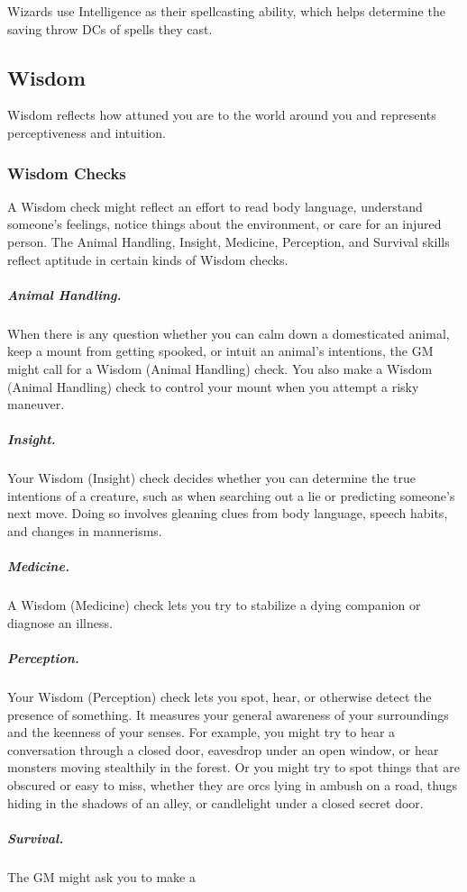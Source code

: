 Wizards use Intelligence as their spellcasting ability, which helps determine the saving throw DCs of spells they cast.

\subsection{Wisdom}

Wisdom reflects how attuned you are to the world around you and represents perceptiveness and intuition.

\subsubsection{Wisdom Checks}

A Wisdom check might reflect an effort to read body language, understand someone's feelings, notice things about the environment, or care for an injured person. The Animal Handling, Insight, Medicine, Perception, and Survival skills reflect aptitude in certain kinds of Wisdom checks.

\subparagraph*{Animal Handling.} When there is any question whether you can calm down a domesticated animal, keep a mount from getting spooked, or intuit an animal's intentions, the GM might call for a Wisdom (Animal Handling) check. You also make a Wisdom (Animal Handling) check to control your mount when you attempt a risky maneuver.

\subparagraph*{Insight.} Your Wisdom (Insight) check decides whether you can determine the true intentions of a creature, such as when searching out a lie or predicting someone's next move. Doing so involves gleaning clues from body language, speech habits, and changes in mannerisms.

\subparagraph*{Medicine.} A Wisdom (Medicine) check lets you try to stabilize a dying companion or diagnose an illness.

\subparagraph*{Perception.} Your Wisdom (Perception) check lets you spot, hear, or otherwise detect the presence of something. It measures your general awareness of your surroundings and the keenness of your senses. For example, you might try to hear a conversation through a closed door, eavesdrop under an open window, or hear monsters moving stealthily in the forest. Or you might try to spot things that are obscured or easy to miss, whether they are orcs lying in ambush on a road, thugs hiding in the shadows of an alley, or candlelight under a closed secret door.

\subparagraph*{Survival.} The GM might ask you to make a


